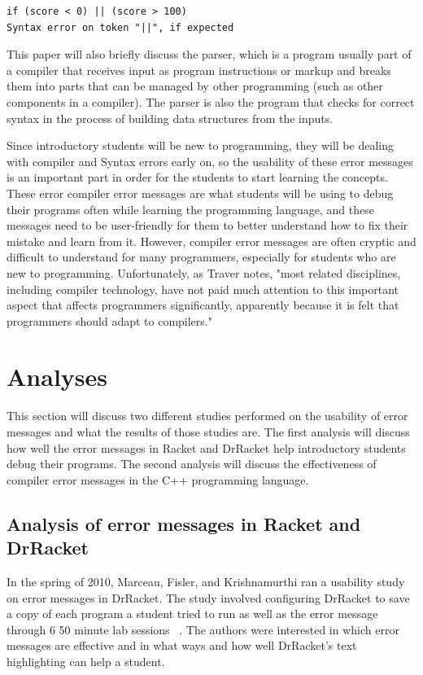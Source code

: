 \documentclass{sig-alternate}
\begin{document}
\begin{verbatim}
if (score < 0) || (score > 100) 
Syntax error on token "||", if expected
\end{verbatim}

This paper will also briefly discuss the parser, which is a program usually part of a compiler that receives input as program instructions or markup and breaks them into parts that can be managed by other programming (such as other components in a compiler). The parser is also the program that checks for correct syntax in the process of building data structures from the inputs. 

Since introductory students will be new to programming, they will be dealing with compiler and Syntax errors early on, so the usability of these error messages is an important part in order for the students to start learning the concepts. These error compiler error messages are what students will be using to debug their programs often while learning the programming language, and these messages need to be user-friendly for them to better understand how to fix their mistake and learn from it. However, compiler error messages are often cryptic and difficult to understand for many programmers, especially for students who are new to programming. Unfortunately, as Traver notes, "most related disciplines, including compiler technology, have not paid much attention to this important aspect that affects programmers significantly, apparently because it is felt that programmers should adapt to compilers." ~\cite{Traver:2010}


\section{Analyses}\label{analyses}
 This section will discuss two different studies performed on the usability of error messages and what the results of those studies are. The first analysis will discuss how well the error messages in Racket and DrRacket help introductory students debug their programs. The second analysis will discuss the effectiveness of compiler error messages in the C++ programming language. 


\subsection{Analysis of error messages in Racket and DrRacket}
In the spring of 2010, Marceau, Fisler, and Krishnamurthi ran a usability study on error messages in DrRacket. The study involved configuring DrRacket to save a copy of each program a student tried to run as well as the error message through 6 50 minute lab sessions ~\cite{Marceau:2011:MEE:1953163.1953308}. The authors were interested in which error messages are effective and in what ways and how well DrRacket's text highlighting can help a student.  
\end{document}
